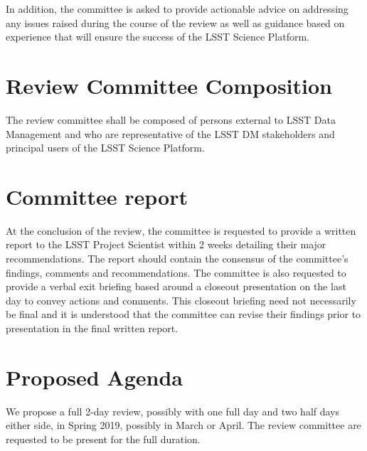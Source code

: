 \documentclass[DM,lsstdraft,STS,toc]{lsstdoc}
\begin{document}
\begin{enumerate}
\end{enumerate}

In addition, the committee is asked to provide actionable advice on addressing any issues raised during the course of the review as well as guidance based on experience that will ensure the success of the LSST Science Platform.

\section{Review Committee Composition}
The review committee shall be composed of persons external to LSST Data Management
and who are representative of the LSST DM stakeholders and principal users of the LSST Science Platform.


\section{Committee report}
At the conclusion of the review, the committee is requested to provide a written report  to the LSST Project Scientist within 2 weeks  detailing
their major recommendations.  The report should contain the consensus of the committee's findings, comments and recommendations. The committee is also requested to
provide a verbal exit briefing based around a closeout presentation on the last day to convey actions and comments. This closeout briefing need not
necessarily be final and it is understood that the committee can revise their findings prior to presentation in the final written report.

\section{Proposed Agenda}
We propose a full 2-day review, possibly with one full day and two half days either side, in Spring 2019, possibly in March or April.
The review committee are requested to be present for the full duration.
\end{document}
